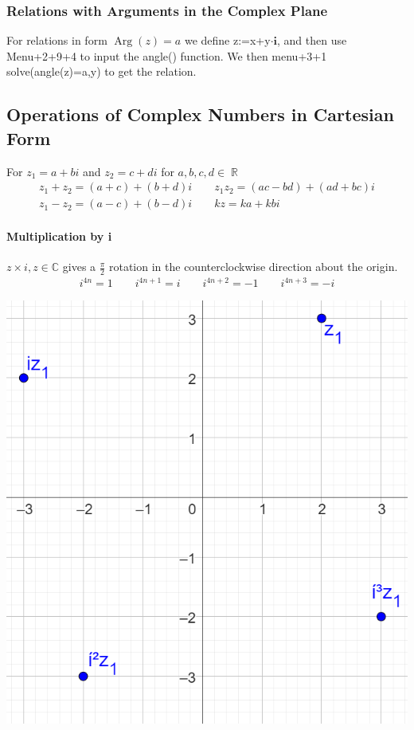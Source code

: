 \documentclass[a4paper,twoside]{article}
\DeclareMathOperator\Arg{Arg}
\DeclareMathOperator\R{\mathbb{R}}
\begin{document}
			\subsubsection{Relations with Arguments in the Complex Plane} For relations in form $\Arg(z)=a$ we define z:=x+y$\cdot\mathbf{i}$, and then use Menu+2+9+4 to input the angle() function. We then menu+3+1 solve(angle(z)=a,y) to get the relation.
		\subsection{Operations of Complex Numbers in Cartesian Form}
			For $z_1=a+bi$ and $z_2=c+di$ for $a,b,c,d\in\R$
			\begin{align*}
				z_1+z_2=(a+c)+(b+d)i \qquad z_1z_2=(ac-bd)+(ad+bc)i \\
				z_1-z_2=(a-c)+(b-d)i \qquad kz=ka+kbi
			\end{align*}
			\begin{minipage}{0.5\textwidth}
				\paragraph{Multiplication by i} $z\times i,z\in\mathbb{C}$ gives a $\frac{\pi}{2}$ rotation in the counterclockwise direction about the origin.
				\begin{align*}
					i^{4n}=1 \qquad i^{4n+1}=i \qquad i^{4n+2}=-1 \qquad i^{4n+3}=-i
				\end{align*}
			\end{minipage}
			\hfill
			\begin{minipage}{0.4\textwidth}
				\includegraphics[width=\linewidth]{argandrotate.png}
			\end{minipage}
\end{document}

